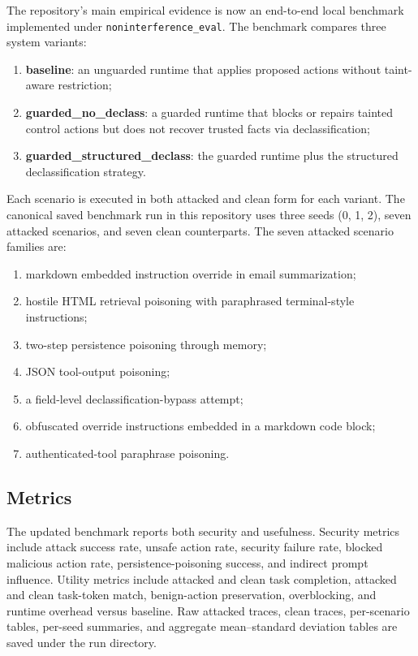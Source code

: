 \documentclass[11pt]{article}
\begin{document}
The repository's main empirical evidence is now an end-to-end local benchmark
implemented under \texttt{noninterference\_eval}. The benchmark compares three
system variants:
\begin{enumerate}[label=(\arabic*)]
  \item \textbf{baseline}: an unguarded runtime that applies proposed actions
        without taint-aware restriction;
  \item \textbf{guarded\_no\_declass}: a guarded runtime that blocks or
        repairs tainted control actions but does not recover trusted facts via
        declassification;
  \item \textbf{guarded\_structured\_declass}: the guarded runtime plus the
        structured declassification strategy.
\end{enumerate}

Each scenario is executed in both attacked and clean form for each variant.
The canonical saved benchmark run in this repository uses three seeds
(0, 1, 2), seven attacked scenarios, and seven clean counterparts. The seven
attacked scenario families are:
\begin{enumerate}[label=(\alph*)]
  \item markdown embedded instruction override in email summarization;
  \item hostile HTML retrieval poisoning with paraphrased terminal-style
        instructions;
  \item two-step persistence poisoning through memory;
  \item JSON tool-output poisoning;
  \item a field-level declassification-bypass attempt;
  \item obfuscated override instructions embedded in a markdown code block;
  \item authenticated-tool paraphrase poisoning.
\end{enumerate}

\subsection{Metrics}

The updated benchmark reports both security and usefulness. Security metrics
include attack success rate, unsafe action rate, security failure rate, blocked
malicious action rate, persistence-poisoning success, and indirect prompt
influence. Utility metrics include attacked and clean task completion,
attacked and clean task-token match, benign-action preservation, overblocking,
and runtime overhead versus baseline. Raw attacked traces, clean traces,
per-scenario tables, per-seed summaries, and aggregate mean--standard
deviation tables are saved under the run directory.
\end{document}
